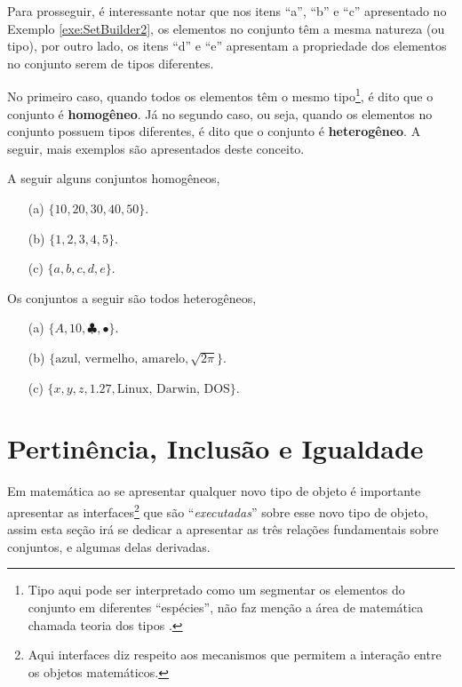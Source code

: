 Para prosseguir, é interessante notar que nos itens ``a'', ``b'' e ``c'' apresentado no Exemplo \ref{exe:SetBuilder2}, os elementos no conjunto têm a mesma natureza (ou tipo), por outro lado, os itens ``d'' e ``e'' apresentam a propriedade dos elementos no conjunto serem de tipos diferentes. 

No primeiro caso, quando todos os elementos têm o mesmo tipo\footnote{Tipo aqui pode ser interpretado como um segmentar os elementos do conjunto em diferentes ``espécies'', não faz menção a área de matemática chamada teoria dos tipos \cite{nederpelt2014}.}, é dito que o conjunto é \textbf{homogêneo}. Já no segundo caso, ou seja, quando os elementos no conjunto possuem tipos diferentes, é dito que o conjunto é \textbf{heterogêneo}. A seguir, mais exemplos são apresentados deste conceito.

\begin{exemplo}\label{exe:ConjuntoHomogeneo1}
  A seguir alguns conjuntos homogêneos, 
  \begin{itemize}
    \item[(a)] $\{10, 20, 30, 40, 50\}$.
    \item[(b)] $\{1, 2, 3, 4, 5\}$.
    \item[(c)] $\{a, b, c, d, e\}$.
  \end{itemize}
\end{exemplo}

\begin{exemplo}\label{exe¨ConjuntoHeterogeneo1}
  Os conjuntos a seguir são todos heterogêneos,
  \begin{itemize}
    \item[(a)] $\{A, 10, \clubsuit, \bullet\}$.
    \item[(b)] $\{\text{azul, vermelho, amarelo}, \sqrt{2\pi}\}$.
    \item[(c)] $\{x, y, z, 1.27, \text{Linux, Darwin, DOS}\}$.
  \end{itemize}
\end{exemplo}

\section{Pertinência, Inclusão e Igualdade}\label{sec:RelacoesFundamentais}

Em matemática ao se apresentar qualquer novo tipo de objeto é importante apresentar as interfaces\footnote{Aqui interfaces diz respeito aos mecanismos que permitem a interação entre os objetos matemáticos.} que são ``\textit{executadas}'' sobre esse novo tipo de objeto, assim esta seção irá se dedicar a apresentar as três relações fundamentais sobre conjuntos, e algumas delas derivadas. 

